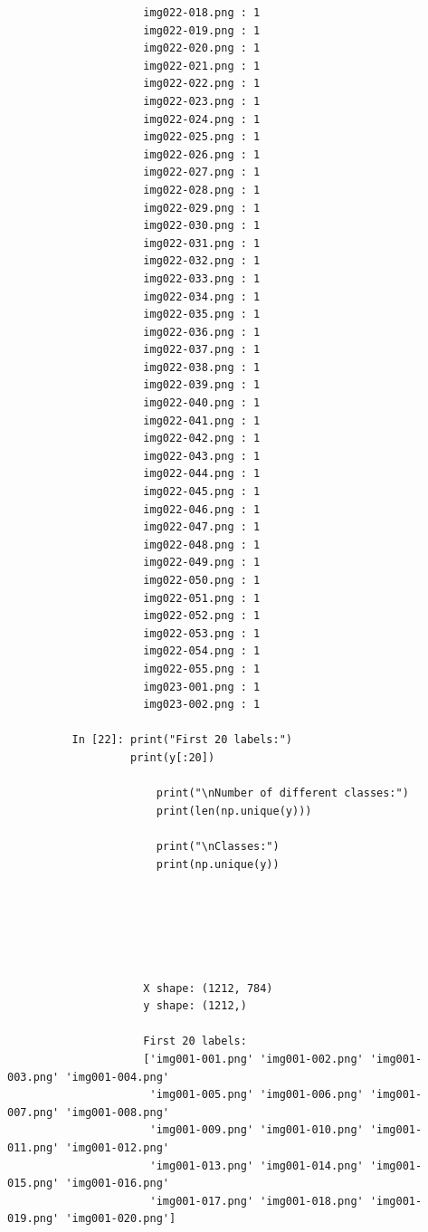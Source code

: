 \documentclass[12pt,a4paper]{article}
\begin{document}
\begin{lstlisting}
                     img022-018.png : 1
                     img022-019.png : 1
                     img022-020.png : 1
                     img022-021.png : 1
                     img022-022.png : 1
                     img022-023.png : 1
                     img022-024.png : 1
                     img022-025.png : 1
                     img022-026.png : 1
                     img022-027.png : 1
                     img022-028.png : 1
                     img022-029.png : 1
                     img022-030.png : 1
                     img022-031.png : 1
                     img022-032.png : 1
                     img022-033.png : 1
                     img022-034.png : 1
                     img022-035.png : 1
                     img022-036.png : 1
                     img022-037.png : 1
                     img022-038.png : 1
                     img022-039.png : 1
                     img022-040.png : 1
                     img022-041.png : 1
                     img022-042.png : 1
                     img022-043.png : 1
                     img022-044.png : 1
                     img022-045.png : 1
                     img022-046.png : 1
                     img022-047.png : 1
                     img022-048.png : 1
                     img022-049.png : 1
                     img022-050.png : 1
                     img022-051.png : 1
                     img022-052.png : 1
                     img022-053.png : 1
                     img022-054.png : 1
                     img022-055.png : 1
                     img023-001.png : 1
                     img023-002.png : 1

          In [22]: print("First 20 labels:")
                   print(y[:20])

                       print("\nNumber of different classes:")
                       print(len(np.unique(y)))

                       print("\nClasses:")
                       print(np.unique(y))






                     X shape: (1212, 784)
                     y shape: (1212,)

                     First 20 labels:
                     ['img001-001.png' 'img001-002.png' 'img001-003.png' 'img001-004.png'
                      'img001-005.png' 'img001-006.png' 'img001-007.png' 'img001-008.png'
                      'img001-009.png' 'img001-010.png' 'img001-011.png' 'img001-012.png'
                      'img001-013.png' 'img001-014.png' 'img001-015.png' 'img001-016.png'
                      'img001-017.png' 'img001-018.png' 'img001-019.png' 'img001-020.png']


\end{lstlisting}
\end{document}
